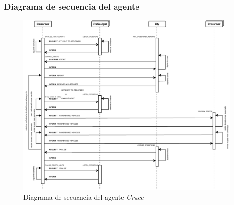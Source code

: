 \newpage
\subsubsection{Diagrama de secuencia del agente}
%
%

\begin{figure}[H]
    \centering
    \includegraphics[width=1\linewidth]{text/image/DAgen-DS-Crossroad.pdf}
    \caption{Diagrama de secuencia del agente \textit{Cruce}}
    \label{fig:ds_agente_cruce}
\end{figure}

\newpage
